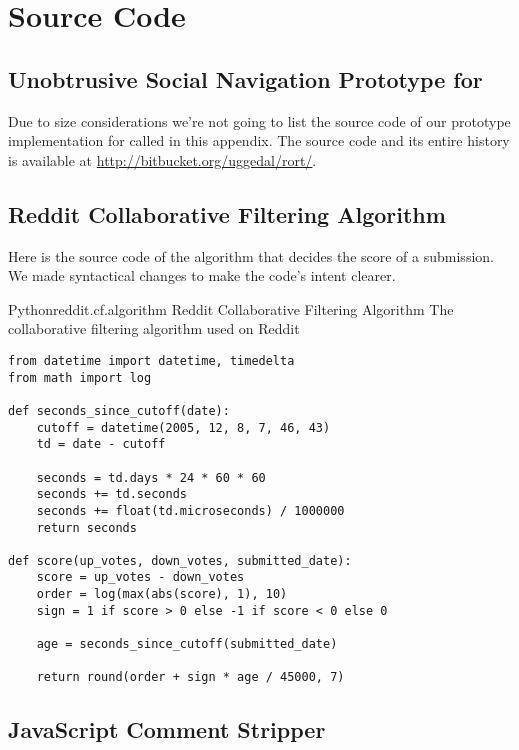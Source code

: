 \chapter{Source Code}

\section{Unobtrusive Social Navigation Prototype for \urort{}}

Due to size considerations we're not going to list the source code of our
prototype implementation for \urort{} called \latest{} in this appendix.
The source code and its entire history is available at
\url{http://bitbucket.org/uggedal/rort/}.

\section{Reddit Collaborative Filtering Algorithm}
\label{section:source.code.reddit}

Here is the source code of the algorithm that decides the score of a
submission. We made syntactical changes to make the code's intent clearer.

\begin{scode}{Python}{reddit.cf.algorithm}{%
  Reddit Collaborative Filtering Algorithm}{%
  The collaborative filtering algorithm used on Reddit}
\begin{lstlisting}
from datetime import datetime, timedelta
from math import log

def seconds_since_cutoff(date):
    cutoff = datetime(2005, 12, 8, 7, 46, 43)
    td = date - cutoff

    seconds = td.days * 24 * 60 * 60
    seconds += td.seconds
    seconds += float(td.microseconds) / 1000000
    return seconds

def score(up_votes, down_votes, submitted_date):
    score = up_votes - down_votes
    order = log(max(abs(score), 1), 10)
    sign = 1 if score > 0 else -1 if score < 0 else 0

    age = seconds_since_cutoff(submitted_date)

    return round(order + sign * age / 45000, 7)
\end{lstlisting}
\end{scode}


\section{JavaScript Comment Stripper}
\label{section:source.code.javascript.comment.stripper}

